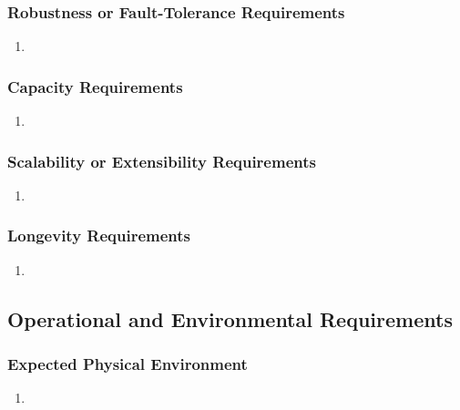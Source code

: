 \documentclass[]{article}
\begin{document}
\subsubsection{Robustness or Fault-Tolerance Requirements}
\label{ssub:robustness_or_fault_tolerance_requirements}
\begin{enumerate}[{PR}1. ]
	\item 
\end{enumerate}

\subsubsection{Capacity Requirements}
\label{ssub:capacity_requirements}
\begin{enumerate}[{PR}1. ]
	\item 
\end{enumerate}

\subsubsection{Scalability or Extensibility Requirements}
\label{ssub:scalability_or_extensibility_requirements}
\begin{enumerate}[{PR}1. ]
	\item 
\end{enumerate}

\subsubsection{Longevity Requirements}
\label{ssub:longevity_requirements}
\begin{enumerate}[{PR}1. ]
	\item 
\end{enumerate}


\subsection{Operational and Environmental Requirements}
\label{sub:operational_and_environmental_requirements}

\subsubsection{Expected Physical Environment}
\label{ssub:expected_physical_environment}
\begin{enumerate}[{OE}1. ]
	\item 
\end{enumerate}
\end{document}
